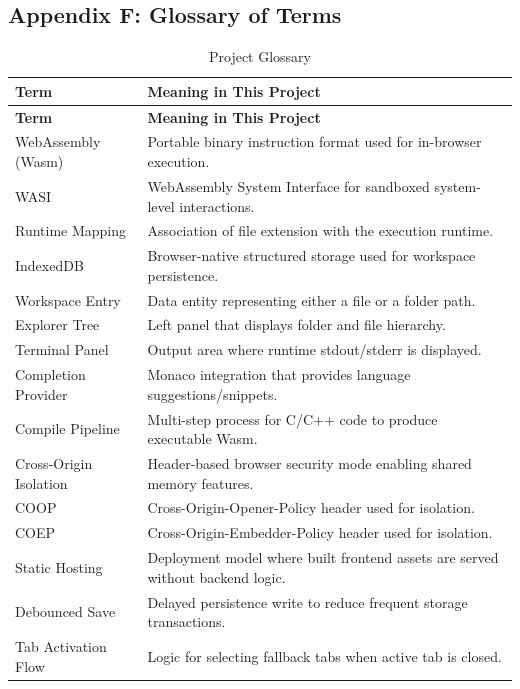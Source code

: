 \subsection*{Appendix F: Glossary of Terms}
\begin{longtable}{p{3.2cm}p{9.2cm}}
\caption{Project Glossary}\\
\toprule
\textbf{Term} & \textbf{Meaning in This Project} \\
\midrule
\endfirsthead
\toprule
\textbf{Term} & \textbf{Meaning in This Project} \\
\midrule
\endhead
WebAssembly (Wasm) & Portable binary instruction format used for in-browser execution. \\
WASI & WebAssembly System Interface for sandboxed system-level interactions. \\
Runtime Mapping & Association of file extension with the execution runtime. \\
IndexedDB & Browser-native structured storage used for workspace persistence. \\
Workspace Entry & Data entity representing either a file or a folder path. \\
Explorer Tree & Left panel that displays folder and file hierarchy. \\
Terminal Panel & Output area where runtime stdout/stderr is displayed. \\
Completion Provider & Monaco integration that provides language suggestions/snippets. \\
Compile Pipeline & Multi-step process for C/C++ code to produce executable Wasm. \\
Cross-Origin Isolation & Header-based browser security mode enabling shared memory features. \\
COOP & Cross-Origin-Opener-Policy header used for isolation. \\
COEP & Cross-Origin-Embedder-Policy header used for isolation. \\
Static Hosting & Deployment model where built frontend assets are served without backend logic. \\
Debounced Save & Delayed persistence write to reduce frequent storage transactions. \\
Tab Activation Flow & Logic for selecting fallback tabs when active tab is closed. \\
\bottomrule
\end{longtable}

